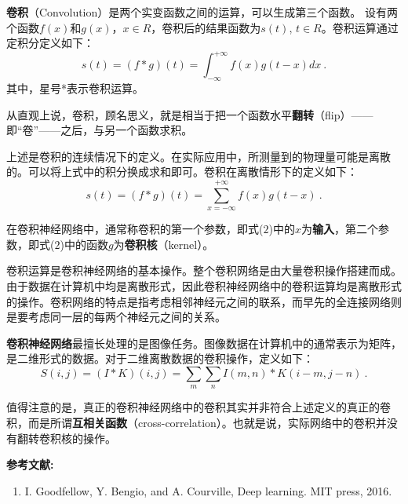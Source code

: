 


\textbf{卷积}（Convolution）是两个实变函数之间的运算，可以生成第三个函数。
设有两个函数$f(x)$和$g(x)$，$x \in R$，卷积后的结果函数为$s(t)$, $t \in R$。卷积运算通过定积分定义如下：
\begin{equation}
s(t) = (f*g)(t) = \int_{ - \infty }^{ + \infty } {f(x)g(t - x)dx}~.
\end{equation}
其中，星号*表示卷积运算。

从直观上说，卷积，顾名思义，就是相当于把一个函数水平\textbf{翻转}（flip）——即“卷”——之后，与另一个函数求积。

上述是卷积的连续情况下的定义。在实际应用中，所测量到的物理量可能是离散的。可以将上式中的积分换成求和即可。卷积在离散情形下的定义如下：
\begin{equation}
s(t) = (f*g)(t) = \sum_{ x = - \infty }^{ + \infty } {f(x)g(t - x)}~.
\end{equation}

在卷积神经网络中，通常称卷积的第一个参数，即式($2$)中的$x$为\textbf{输入}，第二个参数，即式($2$)中的函数$g$为\textbf{卷积核}（kernel）。

卷积运算是卷积神经网络的基本操作。整个卷积网络是由大量卷积操作搭建而成。由于数据在计算机中均是离散形式，因此卷积神经网络中的卷积运算均是离散形式的操作。卷积网络的特点是指考虑相邻神经元之间的联系，而早先的全连接网络则是要考虑同一层的每两个神经元之间的关系。

\textbf{卷积神经网络}最擅长处理的是图像任务。图像数据在计算机中的通常表示为矩阵，是二维形式的数据。对于二维离散数据的卷积操作，定义如下：
\begin{equation}
S(i,j) = (I*K)(i,j) = \sum_{m}\sum_{n}I(m,n)*K(i-m,j-n)~.
\end{equation}

值得注意的是，真正的卷积神经网络中的卷积其实并非符合上述定义的真正的卷积，而是所谓\textbf{互相关函数}（cross-correlation）。也就是说，实际网络中的卷积并没有翻转卷积核的操作\cite{GDL}。


\textbf{参考文献:}
\begin{enumerate}
\item I. Goodfellow, Y. Bengio, and A. Courville, Deep learning. MIT press, 2016.
\end{enumerate}